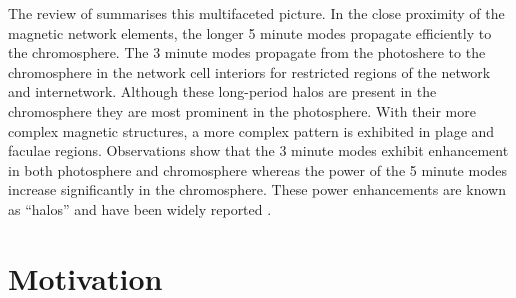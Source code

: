 \documentclass[linenumbers]{aastex63}
\begin{document}
The review of \citet{Khomenko2013} summarises this multifaceted picture. In the close proximity of the magnetic network elements, the longer 5 minute modes propagate efficiently to the chromosphere. The 3 minute modes propagate from the photoshere to the chromosphere in the network cell interiors for restricted regions of the network and internetwork. Although these long-period halos are present in the chromosphere they are most prominent in the photosphere. With their more complex magnetic structures, a more complex pattern is exhibited in plage and faculae regions. Observations show that the 3 minute modes exhibit enhancement in both photosphere and chromosphere whereas the power of the 5 minute modes increase significantly in the chromosphere. These power enhancements are known as “halos” and have been widely reported \cite{Kontogiannis2010}. 







\section{Motivation} \label{sec:motivation}
\end{document}
